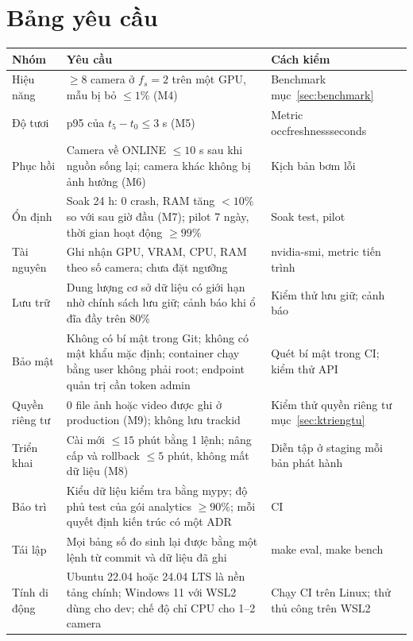 \documentclass[10pt,a4paper,oneside,openany]{report}
\newcommand{\breakus}{\textunderscore\allowbreak}
\newcommand{\code}[1]{{\ttfamily\let\_\breakus #1}}
\newcommand{\tabhead}[1]{\textsf{\bfseries\color{ink}#1}}
\newenvironment{bang}{\par\small\rowcolors{2}{rowgray}{white}}{\par\vspace{0.3em}}
\begin{document}
\section{Bảng yêu cầu}
\begin{bang}
\begin{xltabular}{\linewidth}{L{28mm}Y L{44mm}}
\toprule
\tabhead{Nhóm} & \tabhead{Yêu cầu} & \tabhead{Cách kiểm} \\
\midrule
\endhead
Hiệu năng & $\ge 8$ camera ở $f_s = 2$ trên một GPU, mẫu bị bỏ $\le 1\%$ (M4) & Benchmark mục~\ref{sec:benchmark} \\
Độ tươi & p95 của $t_5 - t_0 \le 3$ s (M5) & Metric \code{occ\_freshness\_seconds} \\
Phục hồi & Camera về \code{ONLINE} $\le 10$ s sau khi nguồn sống lại; camera khác không bị ảnh hưởng (M6) & Kịch bản bơm lỗi \\
Ổn định & Soak 24 h: 0 crash, RAM tăng $< 10\%$ so với sau giờ đầu (M7); pilot 7 ngày, thời gian hoạt động $\ge 99\%$ & Soak test, pilot \\
Tài nguyên & Ghi nhận GPU, VRAM, CPU, RAM theo số camera; chưa đặt ngưỡng & \code{nvidia-smi}, metric tiến trình \\
Lưu trữ & Dung lượng cơ sở dữ liệu có giới hạn nhờ chính sách lưu giữ; cảnh báo khi ổ đĩa đầy trên 80\% & Kiểm thử lưu giữ; cảnh báo \\
Bảo mật & Không có bí mật trong Git; không có mật khẩu mặc định; container chạy bằng user không phải root; endpoint quản trị cần token \code{admin} & Quét bí mật trong CI; kiểm thử API \\
Quyền riêng tư & 0 file ảnh hoặc video được ghi ở production (M9); không lưu \code{track\_id} & Kiểm thử quyền riêng tư mục~\ref{sec:ktriengtu} \\
Triển khai & Cài mới $\le 15$ phút bằng 1 lệnh; nâng cấp và rollback $\le 5$ phút, không mất dữ liệu (M8) & Diễn tập ở staging mỗi bản phát hành \\
Bảo trì & Kiểu dữ liệu kiểm tra bằng mypy; độ phủ test của gói \code{analytics} $\ge 90\%$; mỗi quyết định kiến trúc có một ADR & CI \\
Tái lập & Mọi bảng số đo sinh lại được bằng một lệnh từ commit và dữ liệu đã ghi & \code{make eval}, \code{make bench} \\
Tính di động & Ubuntu 22.04 hoặc 24.04 LTS là nền tảng chính; Windows 11 với WSL2 dùng cho dev; chế độ chỉ CPU cho 1--2 camera & Chạy CI trên Linux; thử thủ công trên WSL2 \\
\bottomrule
\end{xltabular}
\end{bang}
\end{document}
